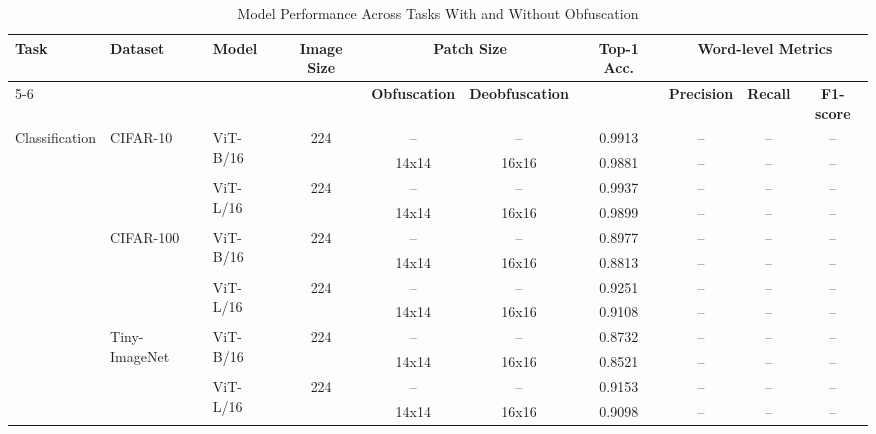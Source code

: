 \documentclass{ieeeaccess}
\begin{document}
\begin{table}[t]
\centering
\caption{Model Performance Across Tasks With and Without Obfuscation}
\label{tab:performance}
\begin{tabular}{lllc|cc|c|ccc}
\toprule
\multirow{3}{*}{\textbf{Task}} & \multirow{3}{*}{\textbf{Dataset}} & \multirow{3}{*}{\textbf{Model}} & \multirow{3}{*}{\textbf{Image Size}} 
& \multicolumn{2}{c|}{\textbf{Patch Size}} 
& \multirow{3}{*}{\textbf{Top-1 Acc.}} 
& \multicolumn{3}{c}{\textbf{Word-level Metrics}} \\

\cmidrule{5-6} \cmidrule{8-10}
& & & 
& \textbf{Obfuscation} & \textbf{Deobfuscation} 
& 
& \textbf{Precision} & \textbf{Recall} & \textbf{F1-score} \\

\midrule
\multirow{8}{*}{Classification} 
& \multirow{4}{*}{CIFAR-10} 
& \multirow{2}{*}{ViT-B/16} & \multirow{2}{*}{224} 
& --     & --     & 0.9913 & --     & --     & --     \\
&       &        &        & 14x14 & 16x16 & 0.9881 & --     & --     & --     \\
& \multirow{2}{*}{} & \multirow{2}{*}{ViT-L/16} & \multirow{2}{*}{224} 
& --     & --     & 0.9937 & --     & --     & --     \\
&       &        &        & 14x14 & 16x16 & 0.9899 & --     & --     & --     \\

& \multirow{4}{*}{CIFAR-100} 
& \multirow{2}{*}{ViT-B/16} & \multirow{2}{*}{224} 
& --     & --     & 0.8977 & --     & --     & --     \\
&       &        &        & 14x14 & 16x16 & 0.8813 & --     & --     & --     \\
& \multirow{2}{*}{} & \multirow{2}{*}{ViT-L/16} & \multirow{2}{*}{224} 
& --     & --     & 0.9251 & --     & --     & --     \\
&       &        &        & 14x14 & 16x16 & 0.9108 & --     & --     & --     \\

& \multirow{4}{*}{Tiny-ImageNet} 
& \multirow{2}{*}{ViT-B/16} & \multirow{2}{*}{224} 
& --     & --     & 0.8732 & --     & --     & --     \\
&       &        &        & 14x14 & 16x16 & 0.8521 & --     & --     & --     \\
& \multirow{2}{*}{} & \multirow{2}{*}{ViT-L/16} & \multirow{2}{*}{224} 
& --     & --     & 0.9153 & --     & --     & --     \\
&       &        &        & 14x14 & 16x16 & 0.9098 & --     & --     & --     \\


\end{tabular}
\end{table}
\end{document}
